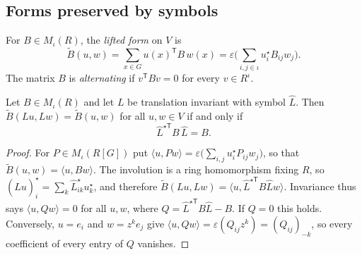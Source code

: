 \subsection{Forms preserved by symbols}\label{sec:qca-forms}

\noindent{}

\begin{definition}\label{def:qca-lift}
For $B\in M_\iota(R)$, the \emph{lifted form} on $V$ is
\[\tilde B(u,w)=\sum_{x\in G}u(x)^{\mathsf T}B\,w(x)
=\varepsilon\Big(\sum_{i,j\in\iota}u_i^\star B_{ij}w_j\Big).\]
The matrix $B$ is \emph{alternating} if $v^{\mathsf T}Bv=0$ for every $v\in R^\iota$.
\end{definition}

\noindent{}

\begin{theorem}\label{thm:qca-criterion}
Let $B\in M_\iota(R)$ and let $L$ be translation invariant with symbol $\hat L$. Then
$\tilde B(Lu,Lw)=\tilde B(u,w)$ for all $u,w\in V$ if and only if
\[\hat L^{\star\mathsf T}B\,\hat L=B.\]
\end{theorem}

\begin{proof}
For $P\in M_\iota(R[G])$ put $\langle u,Pw\rangle=\varepsilon\big(\sum_{i,j}u_i^\star
P_{ij}w_j\big)$, so that $\tilde B(u,w)=\langle u,Bw\rangle$. The involution is a ring homomorphism
fixing $R$, so $(\hat Lu)_i^\star=\sum_k\hat L_{ik}^\star u_k^\star$, and therefore
$\tilde B(Lu,Lw)=\langle u,\hat L^{\star\mathsf T}B\hat Lw\rangle$. Invariance thus says
$\langle u,Qw\rangle=0$ for all $u,w$, where $Q=\hat L^{\star\mathsf T}B\hat L-B$. If $Q=0$ this
holds. Conversely, $u=e_i$ and $w=z^ke_j$ give
$\langle u,Qw\rangle=\varepsilon(Q_{ij}z^k)=(Q_{ij})_{-k}$, so every coefficient of every entry of
$Q$ vanishes.
\end{proof}

